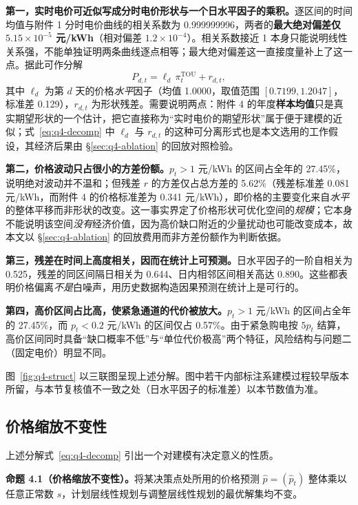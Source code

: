 \textbf{第一，实时电价可近似写成分时电价形状与一个日水平因子的乘积。}逐区间的时间均值与附件 1 分时电价曲线的相关系数为 0.999999996，两者的\textbf{最大绝对偏差仅 $5.15\times10^{-5}$ 元/kWh}（相对偏差 $1.2\times10^{-4}$）。相关系数接近 1 本身只能说明线性关系强，不能单独证明两条曲线逐点相等；最大绝对偏差这一直接度量补上了这一点。据此可作分解
\begin{equation}
  P_{d,t}=\ell_d\,\pi_t^{\mathrm{TOU}}+r_{d,t},
  \label{eq:q4-decomp}
\end{equation}
其中 $\ell_d$ 为第 $d$ 天的价格\emph{水平}因子（均值 1.0000，取值范围 $[0.7199,1.2047]$，标准差 0.129），$r_{d,t}$ 为形状残差。需要说明两点：附件 4 的年度\textbf{样本均值}只是真实期望形状的一个估计，把它直接称为``实时电价的期望形状''属于便于建模的近似；式~\eqref{eq:q4-decomp} 中 $\ell_d$ 与 $r_{d,t}$ 的这种可分离形式也是本文选用的工作假设，其经济后果由 \S\ref{sec:q4-ablation} 的回放对照检验。

\textbf{第二，价格波动只占很小的方差份额。}$p_t>1$ 元/kWh 的区间占全年的 27.45\%，说明绝对波动并不温和；但残差 $r$ 的方差仅占总方差的 5.62\%（残差标准差 0.081 元/kWh，而附件 4 的价格标准差为 0.341 元/kWh），即价格的主要变化来自\emph{水平}的整体平移而非形状的改变。这一事实界定了价格形状可优化空间的\emph{规模}；它本身不能说明该空间\emph{没有}经济价值，因为高价缺口附近的少量扰动也可能改变成本，故本文以 \S\ref{sec:q4-ablation} 的回放费用而非方差份额作为判断依据。

\textbf{第三，残差在时间上高度相关，因而在统计上可预测。}日水平因子的一阶自相关为 0.525，残差的同区间隔日相关为 0.644、日内相邻区间相关高达 0.890。这些都表明价格偏离\emph{不是}白噪声，用历史数据构造因果预测在统计上是可行的。

\textbf{第四，高价区间占比高，使紧急通道的代价被放大。}$p_t>1$ 元/kWh 的区间占全年的 27.45\%，而 $p_t<0.2$ 元/kWh 的区间仅占 0.57\%。由于紧急购电按 $5p_t$ 结算，高价区间同时具备``缺口概率不低''与``单位代价极高''两个特征，风险结构与问题二（固定电价）明显不同。

图~\ref{fig:q4-struct} 以三联图呈现上述分解。图中若干内部标注系建模过程较早版本所留，与本节复核值不一致之处（日水平因子的标准差）以本节数值为准。

\subsection{价格缩放不变性}
\label{sec:q4-scaling}

上述分解式~\eqref{eq:q4-decomp} 引出一个对建模有决定意义的性质。

\textbf{命题 4.1（价格缩放不变性）。}将某决策点处所用的价格预测 $\hat p=(\hat p_t)$ 整体乘以任意正常数 $s$，计划层线性规划与调整层线性规划的最优解集均不变。

